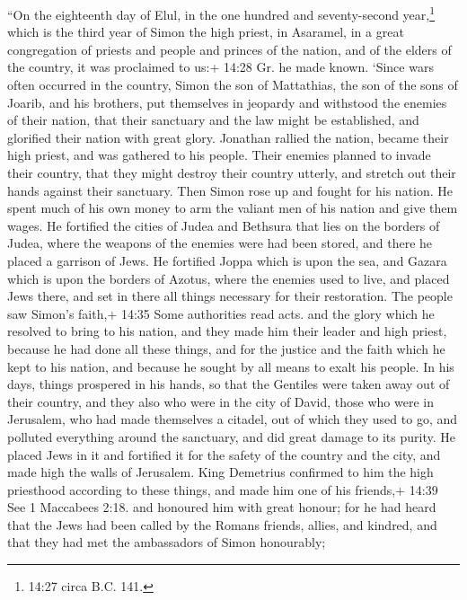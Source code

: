 ``On the eighteenth day of Elul, in the one hundred and seventy-second
year,\footnote{14:27 circa B.C. 141.} which is the third year of Simon
the high priest,  in Asaramel, in a great congregation of
priests and people and princes of the nation, and of the elders of the
country, it was proclaimed to us:+ 14:28 Gr. he made known.
 `Since wars often occurred in the country, Simon the son
of Mattathias, the son of the sons of Joarib, and his brothers, put
themselves in jeopardy and withstood the enemies of their nation, that
their sanctuary and the law might be established, and glorified their
nation with great glory.  Jonathan rallied the nation,
became their high priest, and was gathered to his people. 
Their enemies planned to invade their country, that they might destroy
their country utterly, and stretch out their hands against their
sanctuary.  Then Simon rose up and fought for his nation.
He spent much of his own money to arm the valiant men of his nation and
give them wages.  He fortified the cities of Judea and
Bethsura that lies on the borders of Judea, where the weapons of the
enemies were had been stored, and there he placed a garrison of Jews.
 He fortified Joppa which is upon the sea, and Gazara which
is upon the borders of Azotus, where the enemies used to live, and
placed Jews there, and set in there all things necessary for their
restoration.  The people saw Simon's faith,+ 14:35 Some
authorities read acts. and the glory which he resolved to bring to his
nation, and they made him their leader and high priest, because he had
done all these things, and for the justice and the faith which he kept
to his nation, and because he sought by all means to exalt his people.
 In his days, things prospered in his hands, so that the
Gentiles were taken away out of their country, and they also who were in
the city of David, those who were in Jerusalem, who had made themselves
a citadel, out of which they used to go, and polluted everything around
the sanctuary, and did great damage to its purity.  He
placed Jews in it and fortified it for the safety of the country and the
city, and made high the walls of Jerusalem.  King Demetrius
confirmed to him the high priesthood according to these things,
 and made him one of his friends,+ 14:39 See 1 Maccabees
2:18. and honoured him with great honour;  for he had heard
that the Jews had been called by the Romans friends, allies, and
kindred, and that they had met the ambassadors of Simon honourably;

